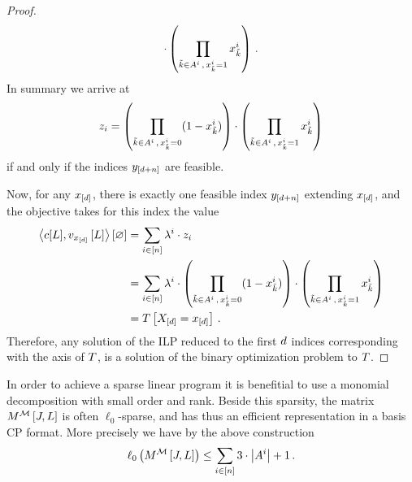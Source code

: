 \begin{proof}
\[    \cdot \left( \prod_{\tilde{k}\in A^{i} \, , \,  x_{\tilde{k}}^i = 1}  x_{\tilde{k}}^i \right)  \, .
    \]
    In summary we arrive at
    \[ z_{i}
    = \left( \prod_{\tilde{k}\in A^{i} \, , \,  x_{\tilde{k}}^i = 0} (1 - x_{\tilde{k}}^i) \right)
    \cdot \left( \prod_{\tilde{k}\in A^{i} \, , \,  x_{\tilde{k}}^i = 1}  x_{\tilde{k}}^i \right)
    \]
    if and only if the indices $y_{[d+n]}$ are feasible.

    Now, for any $x_{[d]}$, there is exactly one feasible index $y_{[d+n]}$ extending $x_{[d]}$, and the objective takes for this index the value
    \begin{align*}
        \left\langle c[L], v_{x_{[d]}}\left[L\right]\right\rangle \left[ \varnothing \right]
        &= \sum_{i\in[n]} \lambda^{i} \cdot z_{i} \\
        &= \sum_{i\in[n]} \lambda^{i} \cdot \left( \prod_{\tilde{k}\in A^{i} \, , \,  x_{\tilde{k}}^i = 0} (1 - x_{\tilde{k}}^i) \right)
        \cdot \left( \prod_{\tilde{k}\in A^{i} \, , \,  x_{\tilde{k}}^i = 1}  x_{\tilde{k}}^i \right)  \\
        & = T\left[X_{[d]}=x_{[d]}\right] \, .
    \end{align*}
    Therefore, any solution of the ILP reduced to the first $d$ indices corresponding with the axis of $T$, is a solution of the binary optimization problem to $T$.
\end{proof}


In order to achieve a sparse linear program it is benefitial to use a monomial decomposition with small order and rank.
Beside this sparsity, the matrix $M^{\mathcal{M}}\left[J,L\right]$ is often $\ell_0$-sparse, and has thus an efficient representation in a basis CP format.
More precisely we have by the above construction
\begin{align*}
    \ell_0\left(M^{\mathcal{M}}\left[J,L\right]\right) \leq \sum_{i\in[n]} 3 \cdot \left|A^{i}\right| +1 \, .
\end{align*}


